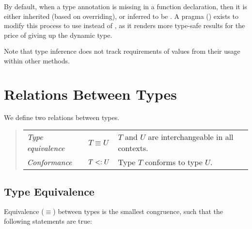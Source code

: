 By default, when a type annotation is missing in a function declaration, then it is either inherited (based on overriding), or inferred to be . A pragma () exists to modify this process to use  instead of , as it renders more type-safe results for the price of giving up the dynamic  type. 

Note that  type inference does not track requirements of values from their usage within other methods.






\section{Relations Between Types}

We define two relations between types. 
\begin{quote}\begin{tabular}{l@{\gap}l@{\gap}l}
\em Type equivalence & $T \equiv U$ & $T$ and $U$ are interchangeable
in all contexts.
\\
\em Conformance & $T <: U$ & Type $T$ conforms to type $U$.
\end{tabular}\end{quote}






\subsection{Type Equivalence}

Equivalence ($\equiv$) between types is the smallest congruence, such that the following statements are true:

